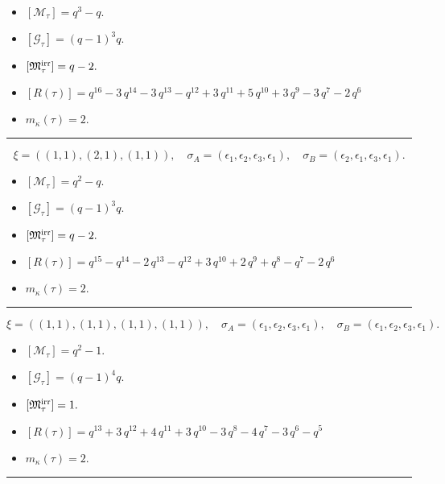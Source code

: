 \documentclass[10pt,a4paper]{amsart}
\begin{document}
\begin{itemize}
 \item $[\mathcal{M}_{\tau}] = q^{3} - q .$

 \item $[\mathcal{G}_{\tau}] = {\left(q - 1\right)}^{3} q .$

 \item $[{\frak M}_{\tau}^{\textrm{irr}}] = q - 2 .$

 \item $[R(\tau)] = q^{16} - 3 \, q^{14} - 3 \, q^{13} - q^{12} + 3 \, q^{11} + 5 \, q^{10} + 3 \, q^{9} - 3 \, q^{7} - 2 \, q^{6} $

 \item $m_{\kappa}(\tau) = 2 .$

 \end{itemize}
\noindent\rule{8cm}{0.4pt}

$$\xi = ({(1, 1), (2, 1)}, {(1, 1)}),\quad \sigma_A = ({{\epsilon_1}, {\epsilon_2, \epsilon_3}}, {{\epsilon_1}}),\quad \sigma_B = ({{\epsilon_2}, {\epsilon_1, \epsilon_3}}, {{\epsilon_1}}).$$

\begin{itemize}
 \item $[\mathcal{M}_{\tau}] = q^{2} - q .$

 \item $[\mathcal{G}_{\tau}] = {\left(q - 1\right)}^{3} q .$

 \item $[{\frak M}_{\tau}^{\textrm{irr}}] = q - 2 .$

 \item $[R(\tau)] = q^{15} - q^{14} - 2 \, q^{13} - q^{12} + 3 \, q^{10} + 2 \, q^{9} + q^{8} - q^{7} - 2 \, q^{6} $

 \item $m_{\kappa}(\tau) = 2 .$

 \end{itemize}
\noindent\rule{8cm}{0.4pt}

$$\xi = ({(1, 1), (1, 1), (1, 1)}, {(1, 1)}),\quad \sigma_A = ({{\epsilon_1}, {\epsilon_2}, {\epsilon_3}}, {{\epsilon_1}}),\quad \sigma_B = ({{\epsilon_1}, {\epsilon_2}, {\epsilon_3}}, {{\epsilon_1}}).$$

\begin{itemize}
 \item $[\mathcal{M}_{\tau}] = q^{2} - 1 .$

 \item $[\mathcal{G}_{\tau}] = {\left(q - 1\right)}^{4} q .$

 \item $[{\frak M}_{\tau}^{\textrm{irr}}] = 1 .$

 \item $[R(\tau)] = q^{13} + 3 \, q^{12} + 4 \, q^{11} + 3 \, q^{10} - 3 \, q^{8} - 4 \, q^{7} - 3 \, q^{6} - q^{5} $

 \item $m_{\kappa}(\tau) = 2 .$

 \end{itemize}
\noindent\rule{8cm}{0.4pt}
\end{document}
